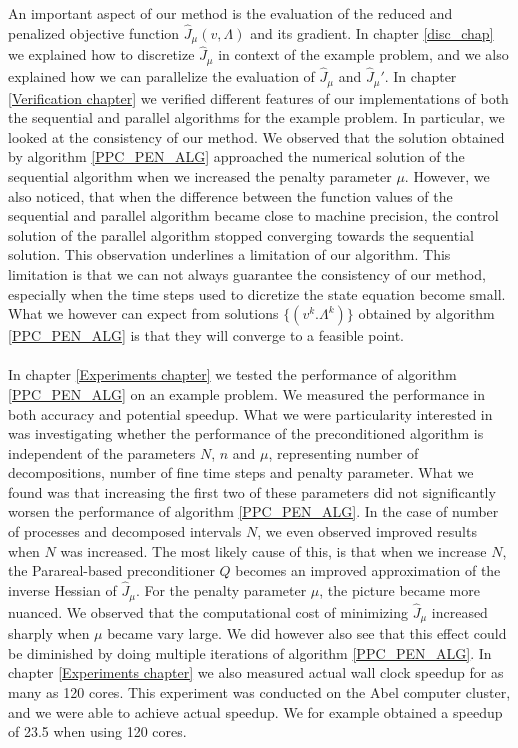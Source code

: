 An important aspect of our method is the evaluation of the reduced and penalized objective function $\hat J_{\mu}(v,\Lambda)$ and its gradient. In chapter \ref{disc_chap} we explained how to discretize $\hat J_{\mu}$ in context of the example problem, and we also explained how we can parallelize the evaluation of $\hat J_{\mu}$ and $\hat J_{\mu}'$. In chapter \ref{Verification chapter} we verified different features of our implementations of both the sequential and parallel algorithms for the example problem. In particular, we looked at the consistency of our method. We observed that the solution obtained by algorithm \ref{PPC_PEN_ALG} approached the numerical solution of the sequential algorithm when we increased the penalty parameter $\mu$. However, we also noticed, that when the difference between the function values of the sequential and parallel algorithm became close to machine precision, the control solution of the parallel algorithm stopped converging towards the sequential solution. This observation underlines a limitation of our algorithm. This limitation is that we can not always guarantee the consistency of our method, especially when the time steps used to dicretize the state equation become small. What we however can expect from solutions $\{(v^k.\Lambda^k)\}$ obtained by algorithm \ref{PPC_PEN_ALG} is that they will converge to a feasible point.
\\
\\
In chapter \ref{Experiments chapter} we tested the performance of algorithm \ref{PPC_PEN_ALG} on an example problem. We measured the performance in both accuracy and potential speedup. What we were particularity interested in was investigating whether the performance of the preconditioned algorithm is independent of the parameters $N$, $n$ and $\mu$, representing number of decompositions, number of fine time steps and penalty parameter. What we found was that increasing the first two of these parameters did not significantly worsen the performance of algorithm \ref{PPC_PEN_ALG}. In the case of number of processes and decomposed intervals $N$, we even observed improved results when $N$ was increased. The most likely cause of this, is that when we increase $N$, the Parareal-based preconditioner $Q$ becomes an improved approximation of the inverse Hessian of $\hat J_{\mu}$. For the penalty parameter $\mu$, the picture became more nuanced. We observed that the computational cost of minimizing $\hat J_{\mu}$ increased sharply when $\mu$ became vary large. We did however also see that this effect could be diminished by doing multiple iterations of algorithm \ref{PPC_PEN_ALG}. In chapter \ref{Experiments chapter} we also measured actual wall clock speedup for as many as 120 cores. This experiment was conducted on the Abel computer cluster, and we were able to achieve actual speedup. We for example obtained a speedup of 23.5 when using 120 cores. 
